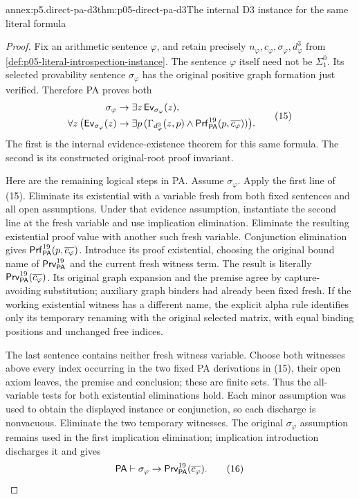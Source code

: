 \begin{annexitem}{annex:p5.direct-pa-d3}{thm:p05-direct-pa-d3}{The internal D3 instance for the same literal formula}
\begin{proof}
Fix an arithmetic sentence \(\varphi\), and retain precisely
\(n_\varphi,c_\varphi,\sigma_\varphi,d^3_\varphi\) from
\cref{def:p05-literal-introspection-instance}. The sentence
\(\varphi\) itself need not be \(\Sigma^0_1\). Its selected
provability sentence \(\sigma_\varphi\) has the original
positive graph formation just verified. Therefore PA proves both
\[
\begin{aligned}
 \sigma_\varphi&\to\exists z\,
                       \mathsf{Ev}_{\sigma_\varphi}(z),\\
 \forall z\,\bigl(\mathsf{Ev}_{\sigma_\varphi}(z)&\to
   \exists p\,(\Gamma_{d^3_\varphi}(z,p)\land
                 \mathsf{Prf}^{19}_{\mathsf{PA}}(p,\overline{c_\varphi}))\bigr).
\end{aligned}
\tag{15}
\]
The first is the internal evidence-existence theorem for this same
formula. The second is its constructed original-root proof invariant.

Here are the remaining logical steps in PA. Assume
\(\sigma_\varphi\). Apply the first line of (15). Eliminate
its existential with a variable fresh from both fixed sentences
and all open assumptions. Under that evidence assumption, instantiate
the second line at the fresh variable and use implication
elimination. Eliminate the resulting existential proof value with
another such fresh variable. Conjunction elimination gives
\(\mathsf{Prf}^{19}_{\mathsf{PA}}(p,\overline{c_\varphi})\).
Introduce its proof existential, choosing the original bound name
of \(\mathsf{Prv}^{19}_{\mathsf{PA}}\) and the current fresh witness
term. The result is literally
\(\mathsf{Prv}^{19}_{\mathsf{PA}}(\overline{c_\varphi})\).
Its original graph expansion and the premise agree by
capture-avoiding substitution; auxiliary graph binders had already
been fixed fresh. If the working existential witness has a different
name, the explicit alpha rule identifies only its temporary
renaming with the original selected matrix, with equal binding
positions and unchanged free indices.

The last sentence contains neither fresh witness variable. Choose
both witnesses above every index occurring in the two fixed PA
derivations in (15), their open axiom leaves, the premise and
conclusion; these are finite sets. Thus the all-variable tests for
both existential eliminations hold. Each minor assumption was used
to obtain the displayed instance or conjunction, so each discharge
is nonvacuous. Eliminate the two temporary witnesses. The original
\(\sigma_\varphi\) assumption remains used in the first
implication elimination; implication introduction discharges it
and gives
\[
       \mathsf{PA}\vdash\sigma_\varphi\to
                 \mathsf{Prv}^{19}_{\mathsf{PA}}(\overline{c_\varphi}).
\tag{16}
\]


\end{proof}
\end{annexitem}
